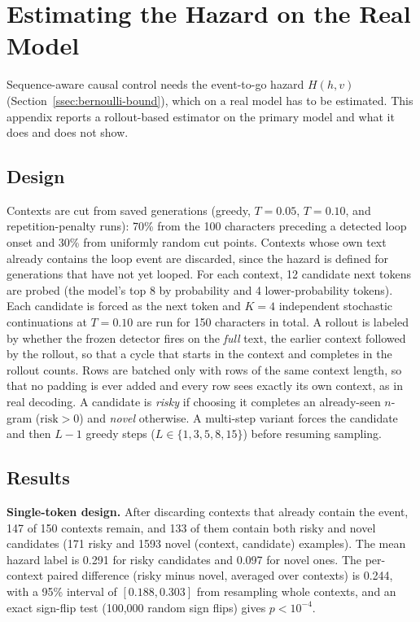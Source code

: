 \documentclass[make,article,submit,pdftex]{Definitions/mdpi}
\newcommand{\risk}{\mathrm{risk}}
\begin{document}

\section{Estimating the Hazard on the Real Model}
\label{sec:hazard-transfer}

Sequence-aware causal control needs the event-to-go hazard $H(h,v)$ (Section~\ref{ssec:bernoulli-bound}), which on a real model has to be estimated. This appendix reports a rollout-based estimator on the primary model and what it does and does not show.

\subsection{Design}
Contexts are cut from saved generations (greedy, $T{=}0.05$, $T{=}0.10$, and repetition-penalty runs): 70\% from the 100 characters preceding a detected loop onset and 30\% from uniformly random cut points. Contexts whose own text already contains the loop event are discarded, since the hazard is defined for generations that have not yet looped. For each context, 12 candidate next tokens are probed (the model's top 8 by probability and 4 lower-probability tokens). Each candidate is forced as the next token and $K{=}4$ independent stochastic continuations at $T{=}0.10$ are run for 150 characters in total. A rollout is labeled by whether the frozen detector fires on the \emph{full} text, the earlier context followed by the rollout, so that a cycle that starts in the context and completes in the rollout counts. Rows are batched only with rows of the same context length, so that no padding is ever added and every row sees exactly its own context, as in real decoding. A candidate is \emph{risky} if choosing it completes an already-seen $n$-gram ($\risk>0$) and \emph{novel} otherwise. A multi-step variant forces the candidate and then $L{-}1$ greedy steps ($L\in\{1,3,5,8,15\}$) before resuming sampling.

\subsection{Results}
\textbf{Single-token design.} After discarding contexts that already contain the event, 147 of 150 contexts remain, and 133 of them contain both risky and novel candidates (171 risky and 1593 novel (context, candidate) examples). The mean hazard label is 0.291 for risky candidates and 0.097 for novel ones. The per-context paired difference (risky minus novel, averaged over contexts) is 0.244, with a 95\% interval of $[0.188,0.303]$ from resampling whole contexts, and an exact sign-flip test (100{,}000 random sign flips) gives $p<10^{-4}$.
\end{document}
